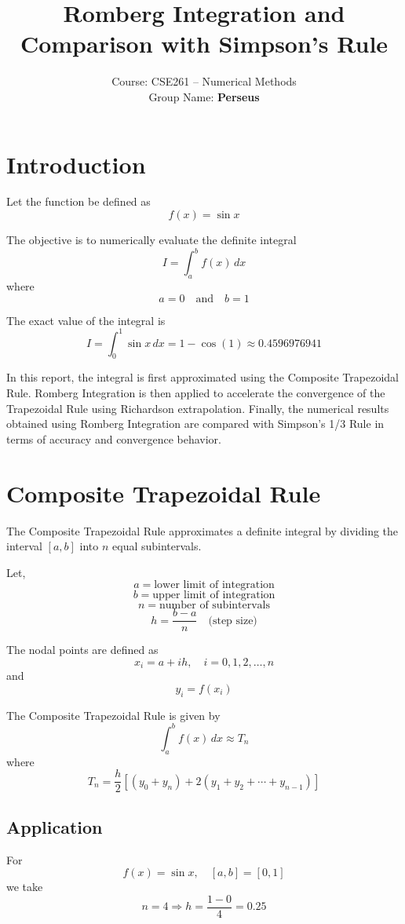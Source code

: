 \documentclass[12pt]{article}
\title{\textbf{Romberg Integration and Comparison with Simpson's Rule}}
\author{
Course: CSE261 -- Numerical Methods\\
Group Name: \textbf{Perseus}
}
\date{}
\begin{document}
\maketitle

\section{Introduction}

Let the function be defined as
\[
f(x) = \sin x
\]

The objective is to numerically evaluate the definite integral
\[
I = \int_a^b f(x)\,dx
\]
where
\[
a = 0 \quad \text{and} \quad b = 1
\]

The exact value of the integral is
\[
I = \int_0^1 \sin x\,dx = 1 - \cos(1) \approx 0.4596976941
\]

In this report, the integral is first approximated using the Composite Trapezoidal Rule.
Romberg Integration is then applied to accelerate the convergence of the Trapezoidal Rule
using Richardson extrapolation. Finally, the numerical results obtained using Romberg
Integration are compared with Simpson’s 1/3 Rule in terms of accuracy and convergence behavior.

\section{Composite Trapezoidal Rule}

The Composite Trapezoidal Rule approximates a definite integral by dividing the interval
$[a,b]$ into $n$ equal subintervals.

Let,
\[
a = \text{lower limit of integration}
\]
\[
b = \text{upper limit of integration}
\]
\[
n = \text{number of subintervals}
\]
\[
h = \frac{b-a}{n} \quad \text{(step size)}
\]

The nodal points are defined as
\[
x_i = a + ih, \quad i = 0,1,2,\ldots,n
\]
and
\[
y_i = f(x_i)
\]

The Composite Trapezoidal Rule is given by
\[
\int_a^b f(x)\,dx \approx T_n
\]
where
\[
T_n = \frac{h}{2}
\left[
(y_0 + y_n) + 2(y_1 + y_2 + \cdots + y_{n-1})
\right]
\]

\subsection*{Application}

For
\[
f(x) = \sin x, \quad [a,b] = [0,1]
\]
we take
\[
n = 4 \Rightarrow h = \frac{1-0}{4} = 0.25
\]
\end{document}
